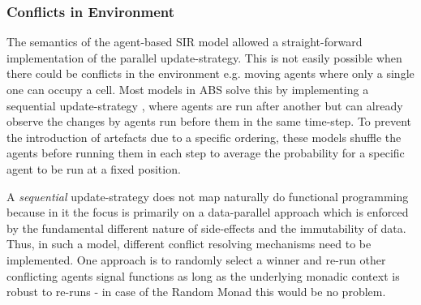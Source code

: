 \subsubsection{Conflicts in Environment}
The semantics of the agent-based SIR model allowed a straight-forward implementation of the parallel update-strategy. This is not easily possible when there could be conflicts in the environment e.g. moving agents where only a single one can occupy a cell. Most models in ABS \cite{epstein_growing_1996} solve this by implementing a sequential update-strategy \cite{thaler_art_2017}, where agents are run after another but can already observe the changes by agents run before them in the same time-step. To prevent the introduction of artefacts due to a specific ordering, these models shuffle the agents before running them in each step to average the probability for a specific agent to be run at a fixed position.

A \textit{sequential} update-strategy does not map naturally do functional programming because in it the focus is primarily on a data-parallel approach which is enforced by the fundamental different nature of side-effects and the immutability of data. Thus, in such a model, different conflict resolving mechanisms need to be implemented. One approach is to randomly select a winner and re-run other conflicting agents signal functions as long as the underlying monadic context is robust to re-runs - in case of the Random Monad this would be no problem.